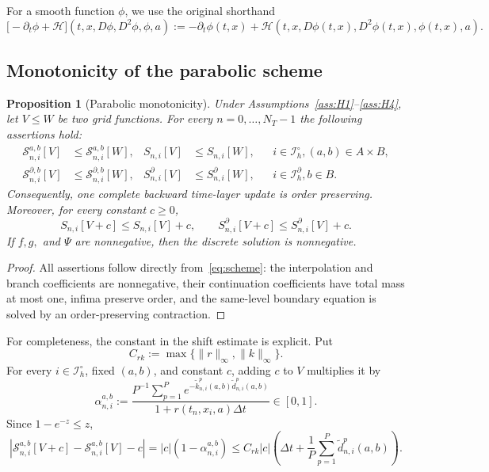 \documentclass[10pt,a4paper]{amsart}
\newtheorem{proposition}[theorem]{Proposition}
\newcommand{\cS}{\mathcal{S}}
\newcommand{\dt}{\Delta t}
\begin{document}
	For a smooth function $\phi$, we use the original shorthand
	\[
	\bigl[-\partial_t\phi+\mathcal H\bigr]
	(t,x,D\phi,D^2\phi,\phi,a)
	:=-\partial_t\phi(t,x)
	+\mathcal H(t,x,D\phi(t,x),D^2\phi(t,x),\phi(t,x),a).
	\]
	
	\subsection{Monotonicity of the parabolic scheme}
	
	\begin{proposition}[Parabolic monotonicity]\label{prop:monotone}
		Under Assumptions~\ref{ass:H1}--\ref{ass:H4}, let $V\le W$ be two grid
		functions.  For every $n=0,\ldots,N_T-1$ the following assertions hold:
		\begin{align}
			\cS_{n,i}^{a,b}[V]&\le\cS_{n,i}^{a,b}[W],
			&S_{n,i}[V]&\le S_{n,i}[W],
			&&i\in\mathcal I_h^\circ, (a,b)\in A\times B,
			\label{eq:para-monotone-interior}\\
			\cS_{n,i}^{\partial,b}[V]&\le\cS_{n,i}^{\partial,b}[W],
			&S_{n,i}^{\partial}[V]&\le S_{n,i}^{\partial}[W],
			&&i\in\mathcal I_h^\partial, b\in B.
			\label{eq:para-monotone-boundary}
		\end{align}
		Consequently, one complete backward time-layer update is order preserving.
		Moreover, for every constant $c\ge0$,
		\begin{equation}
			S_{n,i}[V+c]\le S_{n,i}[V]+c,\qquad
			S_{n,i}^{\partial}[V+c]\le S_{n,i}^{\partial}[V]+c.
			\label{eq:para-shift}
		\end{equation}
		If $f,g,$ and $\Psi$ are nonnegative, then the discrete solution is
		nonnegative.
	\end{proposition}
	
	\begin{proof}
		All assertions follow directly from~\eqref{eq:scheme}: the interpolation and branch coefficients are nonnegative, their continuation coefficients have total mass at most one, infima preserve order, and the same-level boundary equation is solved by an order-preserving contraction.
	\end{proof}
	
	For completeness, the constant in the shift estimate is explicit.  Put
	\[
	C_{rk}:=\max\{\|r\|_\infty,\|k\|_\infty\}.
	\]
	For every
	$i\in\mathcal I_h^\circ$, fixed $(a,b)$, and constant $c$, adding $c$ to
	$V$ multiplies it by
	\[
	\alpha_{n,i}^{a,b}:=
	\frac{P^{-1}\sum_{p=1}^P
		e^{-\widetilde k_{n,i}^p(a,b)\widetilde d_{n,i}^p(a,b)}}
	{1+r(t_n,x_i,a)\dt}\in[0,1].
	\]
	Since $1-e^{-z}\le z$,
	\begin{equation}
		\left|\cS_{n,i}^{a,b}[V+c]-\cS_{n,i}^{a,b}[V]-c\right|
		=|c|(1-\alpha_{n,i}^{a,b})
		\le C_{rk}|c|\left(\dt+\frac1P\sum_{p=1}^P
		\widetilde d_{n,i}^p(a,b)\right).
		\label{eq:shift-defect}
	\end{equation}
	
\end{document}

